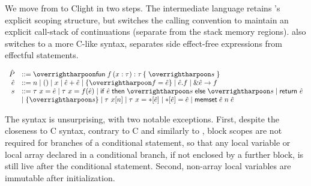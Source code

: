 We move from \lamstar to Clight in two steps. The \cstar intermediate
language retains \lamstar's explicit scoping structure, but switches
the calling convention to maintain an explicit call-stack of
continuations (separate from the stack memory regions). \cstar also
switches to a more C-like syntax, separates side effect-free
expressions from effectful statements.
    
\vspace{-.7em}
\[
  \begin{array}{rl}
    \cp & ::= \ls{\ecfun fx{\tau}{\tau}{\ls{\cstmt}}} \\
    \cexp & ::= n \mid () \mid x \mid \cexp+\cexp \mid \{\ls{\fd=\cexp}\} \mid \cexp.\fd \mid \eptrfd{\cexp}{\fd} \\
    \cstmt & ::= \evardecl {\tau}x{\cexp} \mid \evardecl{\tau}{x}{\eapply f{\cexp}} \mid \eif{\cexp}{\ls{\cstmt}}{\ls{\cstmt}} \mid \ereturn \cexp \\
    & \mid \{\ls{\cstmt}\} \mid \earray {\tau}xn \mid \evardecl{\tau}{x}{\eread {\cexp}} \mid \ewrite {\cexp}{\cexp} \mid \memset{\cexp}{n}{\cexp} \\
  \end{array}
\]

\noindent
The syntax is unsurprising, with two notable exceptions.
%
First, despite the closeness to C syntax, contrary to C and similarly
to \lamstar, block scopes are not required for branches of a
conditional statement, so that any local variable or local array
declared in a conditional branch, if not enclosed by a further block,
is still live after the conditional statement.
%
Second, non-array local variables are immutable after
initialization.

